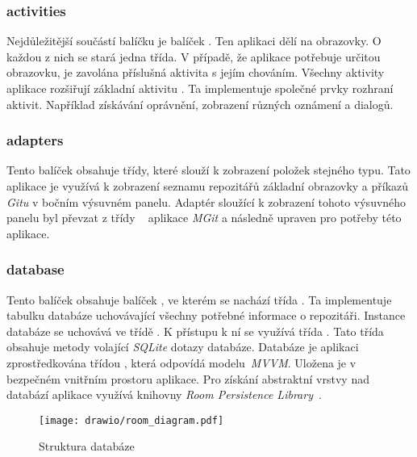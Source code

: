     \newpage
    \subsubsection{activities}
    Nejdůležitější součástí balíčku  je balíček . Ten aplikaci dělí na obrazovky. O každou z nich se stará jedna třída. V případě, že aplikace potřebuje určitou obrazovku, je zavolána příslušná aktivita s jejím chováním. Všechny aktivity aplikace rozšiřují základní aktivitu . Ta implementuje společné prvky rozhraní aktivit. Například získávání oprávnění, zobrazení různých oznámení a dialogů.

    \subsubsection{adapters}
    Tento balíček obsahuje třídy, které slouží k zobrazení položek stejného typu. Tato aplikace je využívá k zobrazení seznamu repozitářů základní obrazovky a příkazů \emph{Gitu} v bočním výsuvném panelu. Adaptér  sloužící k zobrazení tohoto výsuvného panelu byl převzat z třídy ~ aplikace \emph{MGit} a následně upraven pro potřeby této aplikace.

    \subsubsection{database}
    Tento balíček obsahuje balíček , ve kterém se nachází třída . Ta implementuje tabulku databáze uchovávající všechny potřebné informace o repozitáři. Instance databáze se uchovává ve třídě . K přístupu k ní se využívá třída . Tato třída obsahuje metody volající \emph{SQLite} dotazy databáze. Databáze je aplikaci zprostředkována třídou , která odpovídá  modelu~\emph{MVVM}. Uložena je v bezpečném vnitřním prostoru aplikace. Pro získání abstraktní vrstvy nad databází aplikace využívá knihovny \emph{Room Persistence Library}~.

    \begin{figure}[h]
        \centering
        \vspace{0.5cm}
        \texttt{[image: drawio/room\_diagram.pdf]}
        \caption[Struktura databáze]{Struktura databáze~\cite{room-structure}}
        \label{diagram:packages}
    \end{figure}

